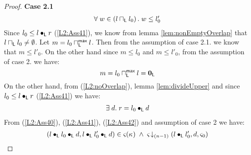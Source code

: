 \begin{lemma}[]
\begin{proof}
\noindent\textbf{Case 2.1} 
%
%
\[
\begin{array}{l}
	\forall\; w \in \left(l \sqcap_{\textsf{L}} l_0 \right).\; w \leq l'_0 
\end{array}
\]
Since $l_0 \leq l \bullet_{\textsf{L}} r$ (\ref{L2:Ass41}), we know from lemma \ref{lem:nonEmptyOverlap} that $l \sqcap_{\textsf{L}} l_0 \not= \emptyset$. Let $m = l_0 \sqcap_{\textsf{L}}^{\textsf{max}} l$. Then from the assumption of case 2.1. we know that $m \leq l'_0$. On the other hand since $m \leq l_0$ and $m \leq l'_0$, from the assumption of case 2. we have:
%
\begin{equation}
	m = l_0 \sqcap_{\textsf{L}}^{\textsf{max}} l = \mathbf{0}_{\textsf{L}} \label{L2:noOverlap}
\end{equation} 
%
On the other hand, from (\ref{L2:noOverlap}), lemma \ref{lem:divideUpper} and since $l_0 \leq l \bullet_{\textsf{L}} r$ (\ref{L2:Ass41}) we have:
%
\begin{align}
	\exists\; d.\; r = l_0 \bullet_{\textsf{L}} d \label{L2:Ass42}
\end{align}
%
From (\ref{L2:Ass40}), (\ref{L2:Ass41}), (\ref{L2:Ass42}) and assumption of case 2 we have:
%
\begin{align}
	& (l \composeL l_0 \composeL d, l \composeL l'_0 \composeL d) \in \amod{}(\ca{}) \;\land\; \extendsAMUpto{\amod{}}{(n-1)}{l \composeL l'_0}{d}{\amod{0}} \nonumber\\

\end{align}
\end{proof}
\end{lemma}
